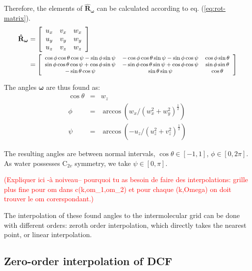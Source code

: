 Therefore, the elements of $\mathbf{\hat{R}}_{\boldsymbol{\omega}}$ can
be calculated according to eq. (\ref{eq:rot-matrix}).
\begin{align}
\mathbf{\hat{R}}_{\boldsymbol{\omega}} & =\left[\begin{array}{ccc}
u_{x} & v_{x} & w_{x}\\
u_{y} & v_{y} & w_{y}\\
u_{z} & v_{z} & w_{z}
\end{array}\right]\\
 & =\footnotesize\left[\begin{array}{ccc}
\cos\phi\cos\theta\cos\psi-\sin\phi\sin\psi & -\cos\phi\cos\theta\sin\psi-\sin\phi\cos\psi & \cos\phi\sin\theta\\
\sin\phi\cos\theta\cos\psi+\cos\phi\sin\psi & -\sin\phi\cos\theta\sin\psi+\cos\phi\cos\psi & \sin\phi\sin\theta\\
-\sin\theta\cos\psi & \sin\theta\sin\psi & \cos\theta
\end{array}\right]\nonumber 
\end{align}


The angles $\boldsymbol{\omega}$ are thus found as:
\begin{eqnarray}
\cos\theta & = & w_{z}\nonumber \\
\phi & = & \arccos(w_{x}/(w_{x}^{2}+w_{y}^{2})^{\frac{1}{2}})\label{eq:omega}\\
\psi & = & \arccos(-u_{z}/(u_{z}^{2}+v_{z}^{2})^{\frac{1}{2}})\nonumber 
\end{eqnarray}


The resulting angles are between normal intervals, $\cos\theta\in\left[-1,1\right]$,
$\phi\in\left[0,2\pi\right]$. As water possesses $\mathrm{C}_{2v}$
symmetry, we take $\psi\in\left[0,\pi\right]$. 

\textcolor{red}{(Expliquer ici -à noiveau-- pourquoi tu as besoin
de faire des interpolations: grille plus fine pour om dans c(k,om\_1,om\_2)
et pour chaque (k,Omega) on doit trouver le om corerspondant.)}

The interpolation of these found angles to the intermolecular grid
can be done with different orders: zeroth order interpolation, which
directly takes the nearest point, or linear interpolation.


\subsection{Zero-order interpolation of DCF\label{sub:Zero-order-interpolation-of}}

